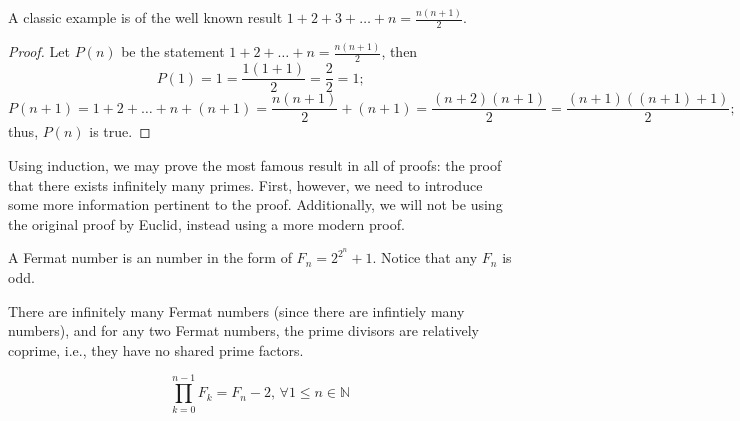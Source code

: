 \documentclass[12pt,oneside]{report}
\begin{document}
A classic example is of the well known result \( 1+2+3+\ldots +n = \frac{n(n+1)}{2} \). 

\begin{proof}
  Let \( P(n)\) be the statement \(1+2+\ldots+n=\frac{n(n+1)}{2} \), then
  \begin{displaymath}
    P(1)= 1 = \frac{1(1+1)}{2}=\frac{2}{2}=1\text{;}
  \end{displaymath}
  \begin{displaymath}
    P(n+1) = 1+2+\ldots +n+(n+1)=\frac{n(n+1)}{2}+(n+1)=\frac{(n+2)(n+1)}{2}=\frac{(n+1)((n+1)+1)}{2}\text{;}
  \end{displaymath}
  thus, \( P(n) \) is true. 
\end{proof}

Using induction, we may prove the most famous result in all of proofs: the proof that there exists infinitely many primes. First, however, we need to introduce some more information pertinent to the proof. Additionally, we will not be using the original proof by Euclid, instead using a more modern proof. 


\begin{definition}
A Fermat number is an number in the form of \( F_n=2^{2^n} +1 \). Notice that any \( F_n \) is odd. 
  
\end{definition}


There are infinitely many Fermat numbers (since there are infintiely many numbers), and for any two Fermat numbers, the prime divisors are relatively coprime, i.e., they have no shared prime factors.

\-

\begin{theorem}
  
  \begin{displaymath}
     \prod_{k=0}^{n-1}F_k=F_n-2, \,  \forall 1\leq n\in \mathbb{N}
  \end{displaymath}
  
\end{theorem}
\end{document}
